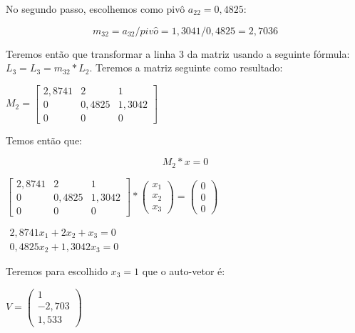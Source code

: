 \begin{example}
No segundo passo, escolhemos como pivô $a_{22}=0,4825$:

$$m_{32}=a_{32}/piv\hat{o}=1,3041/0,4825=2,7036$$

Teremos então que transformar a linha 3 da matriz usando a seguinte fórmula: $L_{3}=L_{3}=m_{32}*L_{2}$. Teremos a matriz seguinte como resultado:

$M_{2}=\left[\begin{array}{ccc}
2,8741 & 2 & 1\\
0 & 0,4825 & 1,3042\\
0 & 0 & 0\end{array}\right]$

Temos então que:

$$M_{2}*x=0$$

$\left[\begin{array}{ccc}
2,8741 & 2 & 1\\
0 & 0,4825 & 1,3042\\
0 & 0 & 0\end{array}\right]*\left(\begin{array}{c}
x_{1}\\
x_{2}\\
x_{3}\end{array}\right)=\left(\begin{array}{c}
0\\
0\\
0\end{array}\right)$

$\begin{array}{c}
2,8741x_{1}+2x_{2}+x_{3}=0\\
0,4825x_{2}+1,3042x_{3}=0\end{array}$

Teremos para escolhido $x_{3}=1$ que o auto-vetor é:

$V=\left(\begin{array}{c}
1\\
-2,703\\
1,533\end{array}\right)$
\end{example}